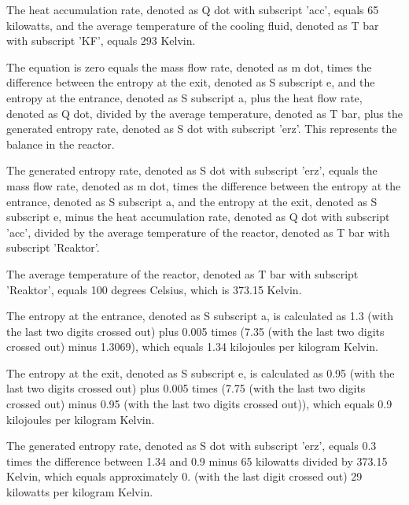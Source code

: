 The heat accumulation rate, denoted as Q dot with subscript 'acc', equals 65 kilowatts, and the average temperature of the cooling fluid, denoted as T bar with subscript 'KF', equals 293 Kelvin.

The equation is zero equals the mass flow rate, denoted as m dot, times the difference between the entropy at the exit, denoted as S subscript e, and the entropy at the entrance, denoted as S subscript a, plus the heat flow rate, denoted as Q dot, divided by the average temperature, denoted as T bar, plus the generated entropy rate, denoted as S dot with subscript 'erz'. This represents the balance in the reactor.

The generated entropy rate, denoted as S dot with subscript 'erz', equals the mass flow rate, denoted as m dot, times the difference between the entropy at the entrance, denoted as S subscript a, and the entropy at the exit, denoted as S subscript e, minus the heat accumulation rate, denoted as Q dot with subscript 'acc', divided by the average temperature of the reactor, denoted as T bar with subscript 'Reaktor'.

The average temperature of the reactor, denoted as T bar with subscript 'Reaktor', equals 100 degrees Celsius, which is 373.15 Kelvin.

The entropy at the entrance, denoted as S subscript a, is calculated as 1.3 (with the last two digits crossed out) plus 0.005 times (7.35 (with the last two digits crossed out) minus 1.3069), which equals 1.34 kilojoules per kilogram Kelvin.

The entropy at the exit, denoted as S subscript e, is calculated as 0.95 (with the last two digits crossed out) plus 0.005 times (7.75 (with the last two digits crossed out) minus 0.95 (with the last two digits crossed out)), which equals 0.9 kilojoules per kilogram Kelvin.

The generated entropy rate, denoted as S dot with subscript 'erz', equals 0.3 times the difference between 1.34 and 0.9 minus 65 kilowatts divided by 373.15 Kelvin, which equals approximately 0. (with the last digit crossed out) 29 kilowatts per kilogram Kelvin.